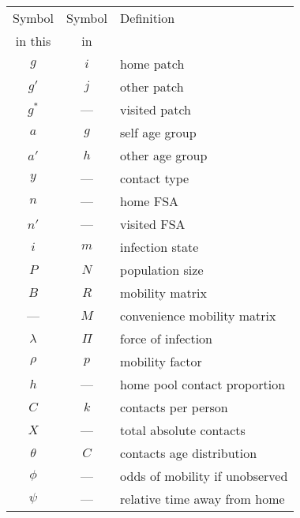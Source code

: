 \begin{tabular}{ccl}
  \toprule
   Symbol   &        Symbol        & Definition                     \\
   in this  & in \cite{Arenas2020} &                                \\
  \midrule
     $g$    &         $i$          & home patch                     \\
    $g'$    &         $j$          & other patch                    \\
    $g^*$   &         ---          & visited patch                  \\
     $a$    &         $g$          & self age group                 \\
    $a'$    &         $h$          & other age group                \\
     $y$    &         ---          & contact type                   \\
     $n$    &         ---          & home FSA                       \\
    $n'$    &         ---          & visited FSA                    \\
     $i$    &         $m$          & infection state                \\
     $P$    &         $N$          & population size                \\
     $B$    &         $R$          & mobility matrix                \\
     ---    &         $M$          & convenience mobility matrix    \\
  $\lambda$ &        $\Pi$         & force of infection             \\
   $\rho$   &         $p$          & mobility factor                \\
     $h$    &         ---          & home pool contact proportion   \\
     $C$    &         $k$          & contacts per person            \\
     $X$    &         ---          & total absolute contacts        \\
  $\theta$  &         $C$          & contacts age distribution      \\
   $\phi$   &         ---          & odds of mobility if unobserved \\
   $\psi$   &         ---          & relative time away from home   \\
  \bottomrule
\end{tabular}
  